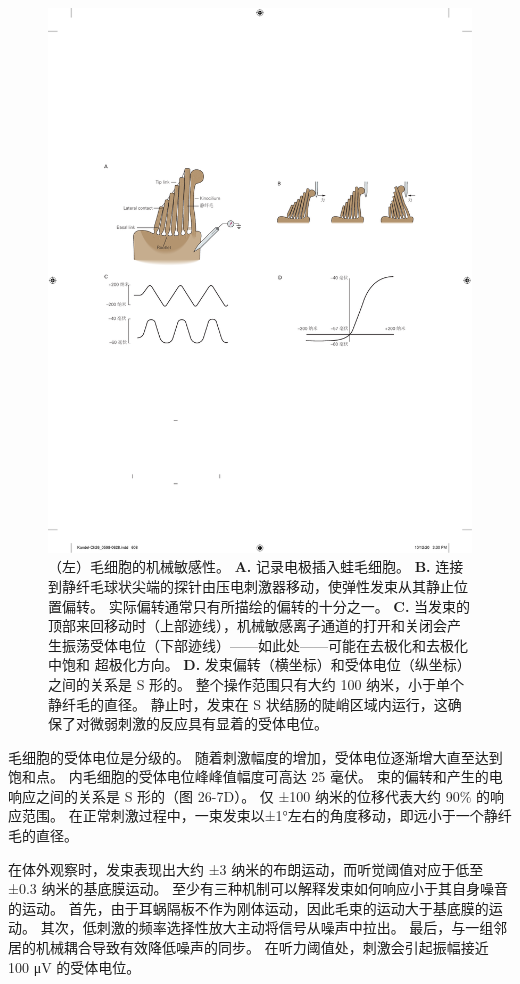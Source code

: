 \begin{figure}[htbp]
	\centering
	\includegraphics[width=0.9\linewidth]{chap26/fig_26_7}
	\caption{（左）毛细胞的机械敏感性。
		\textbf{A.} 记录电极插入蛙毛细胞。
		\textbf{B.} 连接到静纤毛球状尖端的探针由压电刺激器移动，使弹性发束从其静止位置偏转。
		实际偏转通常只有所描绘的偏转的十分之一。
		\textbf{C.} 当发束的顶部来回移动时（上部迹线），机械敏感离子通道的打开和关闭会产生振荡受体电位（下部迹线）——如此处——可能在去极化和去极化中饱和 超极化方向。
		\textbf{D.} 发束偏转（横坐标）和受体电位（纵坐标）之间的关系是 S 形的。
		整个操作范围只有大约 100 纳米，小于单个静纤毛的直径。
		静止时，发束在 S 状结肠的陡峭区域内运行，这确保了对微弱刺激的反应具有显着的受体电位。}
	\label{fig:26_7}
\end{figure}


毛细胞的受体电位是分级的。
随着刺激幅度的增加，受体电位逐渐增大直至达到饱和点。
内毛细胞的受体电位峰峰值幅度可高达 25 毫伏。
束的偏转和产生的电响应之间的关系是 S 形的（图 26-7D）。 
仅 ±100 纳米的位移代表大约 90\% 的响应范围。
在正常刺激过程中，一束发束以±1°左右的角度移动，即远小于一个静纤毛的直径。


在体外观察时，发束表现出大约 ±3 纳米的布朗运动，而听觉阈值对应于低至 ±0.3 纳米的基底膜运动。
至少有三种机制可以解释发束如何响应小于其自身噪音的运动。
首先，由于耳蜗隔板不作为刚体运动，因此毛束的运动大于基底膜的运动。
其次，低刺激的频率选择性放大主动将信号从噪声中拉出。
最后，与一组邻居的机械耦合导致有效降低噪声的同步。 
在听力阈值处，刺激会引起振幅接近 100 μV 的受体电位。


